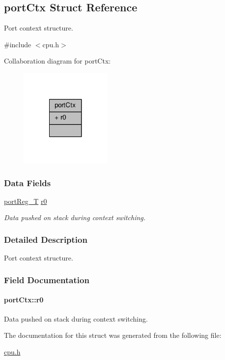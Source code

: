 \hypertarget{structportCtx}{\subsection{port\-Ctx Struct Reference}
\label{structportCtx}
}


Port context structure.  




{\ttfamily \#include $<$cpu.\-h$>$}



Collaboration diagram for port\-Ctx\-:\nopagebreak
\begin{figure}[H]
\begin{center}
\leavevmode
\includegraphics[width=128pt]{structportCtx__coll__graph}
\end{center}
\end{figure}
\subsubsection*{Data Fields}
\begin{DoxyCompactItemize}
\item 
\hyperlink{group__template__cpu__intf_ga99980ab56ce9857e7380210d12e3d41f}{port\-Reg\-\_\-\-T} \hyperlink{structportCtx_a0ee17f42c9b473ddb96365e05c71f086}{r0}
\begin{DoxyCompactList}\small\item\em Data pushed on stack during context switching. \end{DoxyCompactList}\end{DoxyCompactItemize}


\subsubsection{Detailed Description}
Port context structure. 

\subsubsection{Field Documentation}
\hypertarget{structportCtx_a0ee17f42c9b473ddb96365e05c71f086}{
\paragraph[{r0}]{ port\-Ctx\-::r0}}\label{structportCtx_a0ee17f42c9b473ddb96365e05c71f086}


Data pushed on stack during context switching. 



The documentation for this struct was generated from the following file\-:\begin{DoxyCompactItemize}
\item 
\hyperlink{cpu_8h}{cpu.\-h}\end{DoxyCompactItemize}
